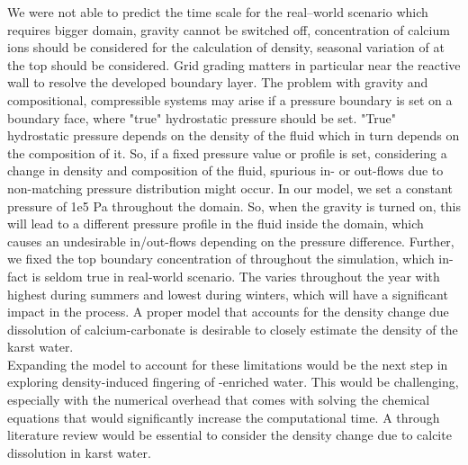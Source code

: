 We were not able to predict the time scale for the real–world scenario which requires bigger domain, gravity 
cannot be switched off, concentration of calcium ions should be considered for the calculation of density, 
seasonal variation of  at the top should be considered. Grid grading matters in particular near the 
reactive wall to resolve the developed boundary layer. The problem with gravity and compositional, compressible 
systems may arise if a pressure boundary is set on a boundary face, where "true" hydrostatic pressure should be set. 
"True" hydrostatic pressure depends on the density of the fluid which in turn depends on the composition of it. 
So, if a fixed pressure value or profile is set, considering a change in density and composition of the fluid, 
spurious in- or out-flows due to non-matching pressure distribution might occur. In our \DuMuX model, we set a 
constant pressure of 1e5 Pa throughout the domain. So, when the gravity is turned on, this will lead to a different 
pressure profile in the fluid inside the domain, which causes an undesirable in/out-flows depending on the pressure 
difference. Further, we fixed the top boundary concentration of  throughout the simulation, which in-fact is 
seldom true in real-world scenario. The  varies throughout the year with highest during summers and lowest 
during winters, which will have a significant impact in the process. A proper model that accounts for the density 
change due dissolution of calcium-carbonate is desirable to closely estimate the density of the karst water.\\

Expanding the model to account for these limitations would be the next step in exploring density-induced fingering 
of -enriched water. This would be challenging, especially with the numerical overhead that comes with solving 
the chemical equations that would significantly increase the computational time. A through literature review would be 
essential to consider the density change due to calcite dissolution in karst water. \\


\endinput
